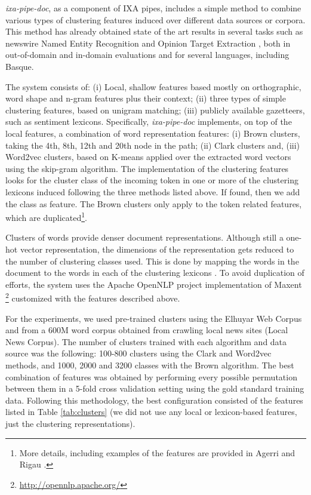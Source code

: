 \documentclass[information,article,submit,moreauthors,pdftex,10pt,a4paper]{Definitions/mdpi}
\begin{document}
\emph{ixa-pipe-doc}, as a component of IXA pipes, includes a simple method to combine various types of clustering features induced over different data sources or corpora. This method has already obtained state of the art results in several tasks such as newswire Named Entity Recognition \cite{agerri2016robust} and Opinion Target Extraction \cite{agerri2019language}, both in out-of-domain and in-domain evaluations and for several languages, including Basque.

The system consists of: (i) Local, shallow features based mostly on orthographic, word shape and n-gram features plus their context; (ii) three types of simple clustering features, based on unigram matching; (iii) publicly available gazetteers, such as sentiment lexicons. Specifically, \emph{ixa-pipe-doc} implements, on top of the local features, a combination of word representation features: (i) Brown \cite{brown1992class} clusters, taking the 4th, 8th, 12th and 20th node in the path; (ii) Clark \cite{clark2003combining} clusters and, (iii) Word2vec \cite{mikolov2013distributed} clusters, based on K-means applied over the extracted word vectors using the skip-gram algorithm. The implementation of the clustering features looks for the cluster class of the incoming token in one or more of the clustering lexicons induced following the three methods listed above. If found, then we add the class as feature. The Brown clusters only apply to the token related features, which are duplicated\footnote{More details, including examples of the features are provided in Agerri and Rigau \cite{agerri2016robust,agerri2019language}.}.

Clusters of words provide denser document representations. Although still a one-hot vector representation, the dimensions of the representation gets reduced to the number of clustering classes used. This is done by mapping the words in the document to the words in each of the clustering lexicons \cite{turian-ratinov-bengio:2010:ACL}. To avoid duplication of efforts, the system uses the Apache OpenNLP project implementation of Maxent \footnote{\url{http://opennlp.apache.org/}} customized with the features described above.

For the experiments, we used pre-trained clusters using the Elhuyar Web Corpus \cite{leturia2012evaluating} and from a 600M word corpus obtained from crawling local news sites (Local News Corpus). The number of clusters trained with each algorithm and data source was the following: 100-800 clusters using the Clark and Word2vec methods, and 1000, 2000 and 3200 classes with the Brown algorithm. The best combination of features was obtained by performing every possible permutation between them in a 5-fold cross validation setting using the gold standard training data. Following this methodology, the best configuration consisted of the features listed in Table \ref{tab:clusters} (we did not use any local or lexicon-based features, just the clustering representations).
\end{document}
